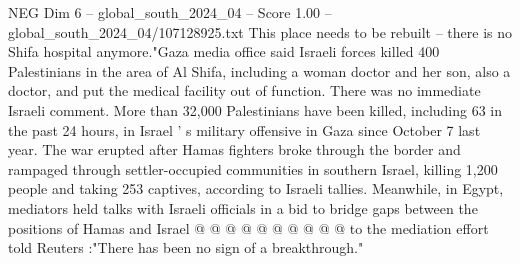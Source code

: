 \begin{textsample}{NEG Dim 6 – global\_south\_2024\_04 – Score 1.00 – global\_south\_2024\_04/107128925.txt}
This place needs to be rebuilt -- there is no Shifa hospital anymore."Gaza media office said Israeli forces killed 400 Palestinians in the area of Al Shifa, including a woman doctor and her son, also a doctor, and put the medical facility out of function.
There was no immediate Israeli comment.
More than 32,000 Palestinians have been killed, including 63 in the past 24 hours, in Israel ' s military offensive in Gaza since October 7 last year.
The war erupted after Hamas fighters broke through the border and rampaged through settler-occupied communities in southern Israel, killing 1,200 people and taking 253 captives, according to Israeli tallies.
Meanwhile, in Egypt, mediators held talks with Israeli officials in a bid to bridge gaps between the positions of Hamas and Israel @ @ @ @ @ @ @ @ @ @ to the mediation effort told Reuters :"There has been no sign of a breakthrough."

\end{textsample}
